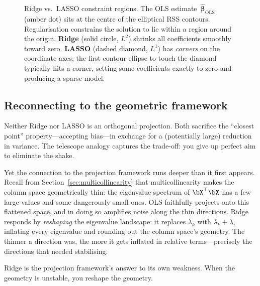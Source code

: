 \begin{figure}[ht]
\caption{Ridge vs.\ LASSO constraint regions.  The OLS
estimate~$\hat{\bm{\beta}}_{\mathrm{OLS}}$ (amber dot) sits at the
centre of the elliptical RSS contours.  Regularisation constrains the
solution to lie within a region around the origin.  \textbf{Ridge}
(solid circle, $L^2$) shrinks all coefficients smoothly toward zero.
\textbf{LASSO} (dashed diamond, $L^1$) has \emph{corners} on the
coordinate axes; the first contour ellipse to touch the diamond
typically hits a corner, setting some coefficients exactly to zero
and producing a sparse model.}
\label{fig:ridge-lasso}
\end{figure}


\subsection{Reconnecting to the geometric framework}

Neither Ridge nor LASSO is an orthogonal projection.
Both sacrifice the ``closest point'' property---accepting bias---in
exchange for a (potentially large) reduction in variance.
The telescope analogy captures the trade-off:
you give up perfect aim to eliminate the shake.

Yet the connection to the projection framework runs deeper than it
first appears.
Recall from Section~\ref{sec:multicollinearity} that
multicollinearity makes the column space geometrically thin:
the eigenvalue spectrum of $\bX^\top\bX$ has a few large values
and some dangerously small ones.
OLS faithfully projects onto this flattened space, and in doing so
amplifies noise along the thin directions.
Ridge responds by \emph{reshaping} the eigenvalue landscape:
it replaces $\lambda_k$ with $\lambda_k + \lambda$, inflating every
eigenvalue and rounding out the column space's geometry.
The thinner a direction was, the more it gets inflated in relative
terms---precisely the directions that needed stabilising.

Ridge is the projection framework's answer to its own weakness.
When the geometry is unstable, you reshape the geometry.


